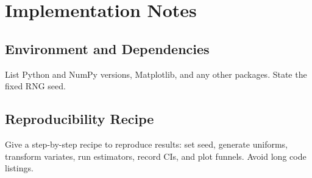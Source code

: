 \section{Implementation Notes}

\subsection{Environment and Dependencies}

List Python and NumPy versions, Matplotlib, and any other packages. State the fixed RNG seed.

\subsection{Reproducibility Recipe}

Give a step-by-step recipe to reproduce results: set seed, generate uniforms, transform variates, run estimators, record CIs, and plot funnels. Avoid long code listings.
